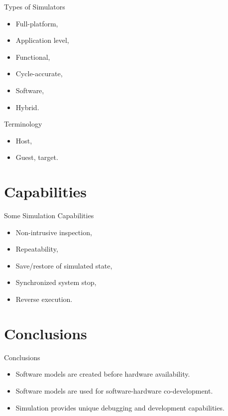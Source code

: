 \begin{frame}{Types of Simulators}
\begin{itemize}
\item Full-platform,
\item Application level,
\item Functional,
\item Cycle-accurate,
\item Software,
\item Hybrid.
\end{itemize}
\end{frame}

\begin{frame} {Terminology}
\begin{itemize}
\item Host,
\item Guest, target.
\end{itemize}
\end{frame}

\section{Capabilities}

\begin{frame}{Some Simulation Capabilities}
\begin{itemize}
\item Non-intrusive inspection,
\item Repeatability,
\item Save/restore of simulated state,
\item Synchronized system stop,
\item Reverse execution.
\end{itemize}
\end{frame}

\section*{Conclusions}

\begin{frame}{Conclusions}
\begin{itemize}
\item Software models are created before hardware availability.
\item Software models are used for software-hardware co-development.
\item Simulation provides unique debugging and development capabilities.
\end{itemize}
\end{frame}

